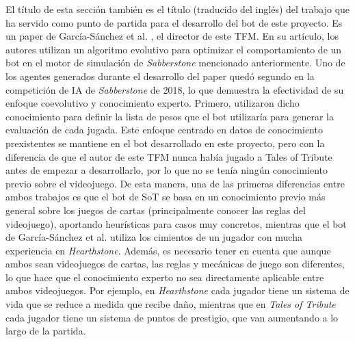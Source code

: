 El título de esta sección también es el título (traducido del inglés) del trabajo que ha servido como punto de partida para el desarrollo del bot de este proyecto. Es un paper de García-Sánchez et al. \cite{garcia-sanchez_optimizing_2020}, el director de este TFM. En su artículo, los autores utilizan un algoritmo evolutivo para optimizar el comportamiento de un bot en el motor de simulación de \textit{Sabberstone} mencionado anteriormente. Uno de los agentes generados durante el desarrollo del paper quedó segundo en la competición de IA de \textit{Sabberstone} de 2018, lo que demuestra la efectividad de su enfoque coevolutivo y conocimiento experto. Primero, utilizaron dicho conocimiento para definir la lista de pesos que el bot utilizaría para generar la evaluación de cada jugada. Este enfoque centrado en datos de conocimiento prexistentes se mantiene en el bot desarrollado en este proyecto, pero con la diferencia de que el autor de este TFM nunca había jugado a Tales of Tribute antes de empezar a desarrollarlo, por lo que no se tenía ningún conocimiento previo sobre el videojuego. De esta manera, una de las primeras diferencias entre ambos trabajos es que el bot de SoT se basa en un conocimiento previo más general sobre los juegos de cartas (principalmente conocer las reglas del videojuego), aportando heurísticas para casos muy concretos, mientras que el bot de García-Sánchez et al. utiliza los cimientos de un jugador con mucha experiencia en \textit{Hearthstone}. Además, es necesario tener en cuenta que aunque ambos sean videojuegos de cartas, las reglas y mecánicas de juego son diferentes, lo que hace que el conocimiento experto no sea directamente aplicable entre ambos videojuegos. Por ejemplo, en \textit{Hearthstone} cada jugador tiene un sistema de vida que se reduce a medida que recibe daño, mientras que en \textit{Tales of Tribute} cada jugador tiene un sistema de puntos de prestigio, que van aumentando a lo largo de la partida.

